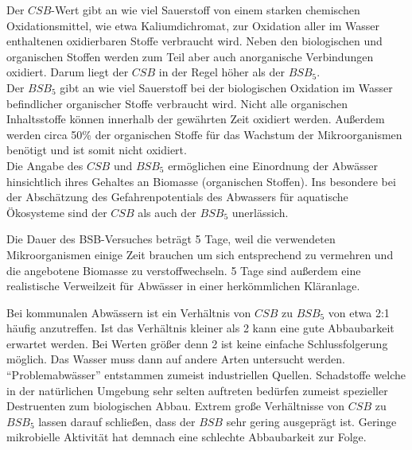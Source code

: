 


Der $CSB$-Wert gibt an wie viel Sauerstoff von einem  starken chemischen Oxidationsmittel, wie etwa Kaliumdichromat, zur Oxidation aller im Wasser enthaltenen oxidierbaren Stoffe verbraucht wird. Neben den biologischen und organischen Stoffen werden zum Teil aber auch anorganische Verbindungen oxidiert. Darum liegt der $CSB$ in der Regel höher als der $BSB_5$.\\
Der $BSB_5$ gibt an wie viel Sauerstoff bei der biologischen Oxidation im Wasser befindlicher organischer Stoffe verbraucht wird. Nicht alle organischen Inhaltsstoffe können innerhalb der gewährten Zeit oxidiert werden. Außerdem werden circa 50\% der organischen Stoffe für das Wachstum der Mikroorganismen benötigt und ist somit nicht oxidiert.\cite[S.64]{rosenwinkelAnaerobtechnikAbwasserSchlamm2015} \\
Die Angabe des $CSB$ und $BSB_5$ ermöglichen eine Einordnung der Abwässer hinsichtlich ihres Gehaltes an Biomasse (organischen Stoffen). Ins besondere bei der Abschätzung des Gefahrenpotentials des Abwassers für aquatische Ökosysteme sind der $CSB$ als auch der $BSB_5$ unerlässich.

 
Die Dauer des BSB-Versuches beträgt 5 Tage, weil die verwendeten Mikroorganismen einige Zeit brauchen um sich entsprechend zu vermehren und die angebotene Biomasse zu verstoffwechseln. 5 Tage sind außerdem eine realistische Verweilzeit für Abwässer in einer herkömmlichen Kläranlage.


Bei kommunalen Abwässern ist ein Verhältnis von $CSB$ zu $BSB_5$ von etwa 2:1 häufig anzutreffen. 
Ist das Verhältnis kleiner als 2 kann eine gute Abbaubarkeit erwartet werden. Bei Werten größer denn 2 ist keine einfache Schlussfolgerung möglich. Das Wasser muss dann auf andere Arten untersucht werden. "`Problemabwässer"' entstammen zumeist industriellen Quellen. Schadstoffe welche in der natürlichen Umgebung sehr  selten auftreten bedürfen zumeist spezieller Destruenten zum biologischen Abbau. Extrem große Verhältnisse von $CSB$ zu $BSB_5$ lassen darauf schließen, dass der $BSB$ sehr gering ausgeprägt ist. Geringe mikrobielle Aktivität hat demnach eine schlechte Abbaubarkeit zur Folge.\cite[S.64]{rosenwinkelAnaerobtechnikAbwasserSchlamm2015}\\


